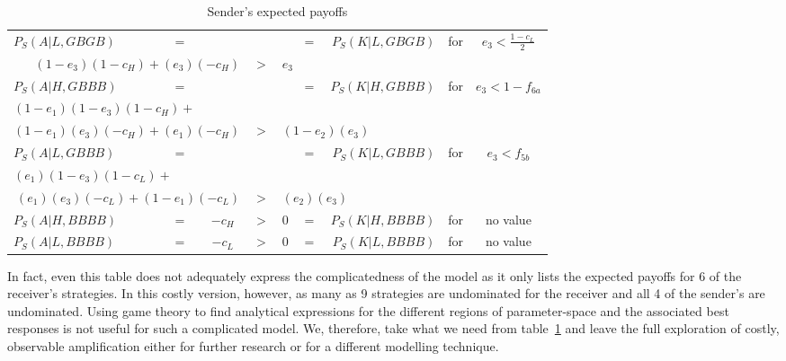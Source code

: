 \documentclass[a4paper,12pt]{article}
\numberwithin{equation}{section}
\begin{document}
\begin{table}[h]
\begin{center}
\begin{tabular}{lcccccrcc}
$P_{S}(A|L,GBGB)$ & $=$ & & & & $=$ & $P_{S}(K|L,GBGB)$ & \multirow{2}{*}{for} & \multirow{2}{*}{$e_{3}<\frac{1-c_{L}}{2}$}
\vspace{-1mm}\\
\multicolumn{3}{r}{$(1-e_{3})(1-c_{H})+(e_{3})(-c_{H})$} & $>$ & \multicolumn{3}{l}{$e_{3}$} &
\vspace{1mm}\\
$P_{S}(A|H,GBBB)$ & $=$ & & & & $=$ & $P_{S}(K|H,GBBB)$ & \multirow{3}{*}{for} & \multirow{3}{*}{$e_{3}<1-f_{6a}$}
\vspace{-1mm}\\
\multicolumn{7}{l}{$(1-e_{1})(1-e_{3})(1-c_{H})+$}
\vspace{-1mm}\\
\multicolumn{3}{r}{$(1-e_{1})(e_{3})(-c_{H})+(e_{1})(-c_{H})$} & $>$ & \multicolumn{3}{l}{$(1-e_{2})(e_{3})$} &
\vspace{1mm}\\
$P_{S}(A|L,GBBB)$ & $=$ & & & & $=$ & $P_{S}(K|L,GBBB)$ & \multirow{3}{*}{for} & \multirow{3}{*}{$e_{3}<f_{5b}$}
\vspace{-1mm}\\
\multicolumn{7}{l}{$(e_{1})(1-e_{3})(1-c_{L})+$}
\vspace{-1mm}\\
\multicolumn{3}{r}{$(e_{1})(e_{3})(-c_{L})+(1-e_{1})(-c_{L})$} & $>$ & \multicolumn{3}{l}{$(e_{2})(e_{3})$} &
\vspace{1mm}\\
$P_{S}(A|H,BBBB)$ & $=$ & $-c_{H}$ & $>$ & $0$ & = & $P_{S}(K|H,BBBB)$ & for & no value\\
$P_{S}(A|L,BBBB)$ & $=$ & $-c_{L}$ & $>$ & $0$ & = & $P_{S}(K|L,BBBB)$ & for & no value
\end{tabular}
\end{center}
\caption{Sender's expected payoffs}
\label{tab:Appendix/Cue Game with Observable Amplification/ConditionalPayoffsS}
\end{table}

In fact, even this table does not adequately express the complicatedness of the model as it only lists the expected payoffs for 6 of the receiver's strategies. In this costly version, however, as many as 9 strategies are undominated for the receiver and all 4 of the sender's are undominated. Using game theory to find analytical expressions for the different regions of parameter-space and the associated best responses is not useful for such a complicated model. We, therefore, take what we need from table~\ref{tab:Appendix/Cue Game with Observable Amplification/ConditionalPayoffsS} and leave the full exploration of costly, observable amplification either for further research or for a different modelling technique.
\end{document}
